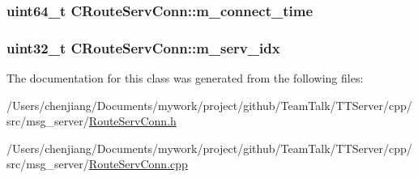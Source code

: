 \subsubsection[{m\+\_\+connect\+\_\+time}]{\setlength{\rightskip}{0pt plus 5cm}uint64\+\_\+t C\+Route\+Serv\+Conn\+::m\+\_\+connect\+\_\+time\hspace{0.3cm}{\ttfamily [private]}}\label{class_c_route_serv_conn_a774c1ac5fa9654a68fc633c138ef2033}
\hypertarget{class_c_route_serv_conn_a9ab761cb4aa9ae90772bb83630f3cc1e}{}
\subsubsection[{m\+\_\+serv\+\_\+idx}]{\setlength{\rightskip}{0pt plus 5cm}uint32\+\_\+t C\+Route\+Serv\+Conn\+::m\+\_\+serv\+\_\+idx\hspace{0.3cm}{\ttfamily [private]}}\label{class_c_route_serv_conn_a9ab761cb4aa9ae90772bb83630f3cc1e}


The documentation for this class was generated from the following files\+:\begin{DoxyCompactItemize}
\item 
/\+Users/chenjiang/\+Documents/mywork/project/github/\+Team\+Talk/\+T\+T\+Server/cpp/src/msg\+\_\+server/\hyperlink{_route_serv_conn_8h}{Route\+Serv\+Conn.\+h}\item 
/\+Users/chenjiang/\+Documents/mywork/project/github/\+Team\+Talk/\+T\+T\+Server/cpp/src/msg\+\_\+server/\hyperlink{_route_serv_conn_8cpp}{Route\+Serv\+Conn.\+cpp}\end{DoxyCompactItemize}
